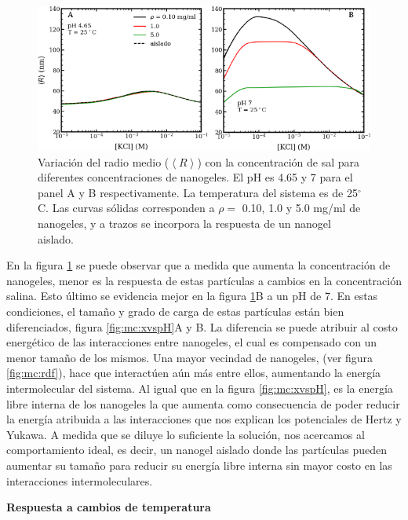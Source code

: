 	\begin{figure}
		\centering
		\includegraphics[width=0.99\linewidth]{Figures/graph-mc/r-salts-pHs.pdf}
		\caption{Variaci\'on del radio medio ($\left<R\right>$) con la concentraci\'on de sal para diferentes concentraciones de nanogeles. El pH es 4.65 y 7 para el panel A y B respectivamente. La temperatura del sistema es de 25$^\circ$C. Las curvas s\'olidas corresponden a $\rho=$ 0.10, 1.0 y 5.0 mg/ml de nanogeles, y a trazos se incorpora la respuesta de un nanogel aislado.}
		\label{fig:mc:reentrante}
	\end{figure}
	
En la figura \ref{fig:mc:reentrante} se puede observar que a medida que aumenta la concentraci\'on de nanogeles, menor es la respuesta de estas part\'iculas a cambios en la concentraci\'on salina. Esto \'ultimo se evidencia mejor en la figura \ref{fig:mc:reentrante}B a un pH de 7. En estas condiciones, el tama\~no y grado de carga de estas part\'iculas est\'an bien diferenciados, figura \ref{fig:mc:xvspH}A y B. La diferencia se puede atribuir al costo energ\'etico de las interacciones entre nanogeles, el cual es compensado con un menor tama\~no de los mismos. Una mayor vecindad de nanogeles, (ver figura \ref{fig:mc:rdf}), hace que interact\'uen a\'un m\'as entre ellos, aumentando la energ\'ia intermolecular del sistema. Al igual que en la figura \ref{fig:mc:xvspH}, es la energ\'ia libre interna de los nanogeles la que aumenta como consecuencia de poder reducir la energ\'ia atribuida a las interacciones que nos explican los potenciales de Hertz y Yukawa. A medida que se diluye lo suficiente la soluci\'on, nos acercamos al comportamiento ideal, es decir, un nanogel aislado donde las part\'iculas pueden aumentar su tama\~no para reducir su energ\'ia libre interna sin mayor costo en las interacciones intermoleculares.
	
	
	\textbf{Respuesta a cambios de temperatura}

